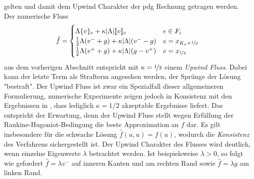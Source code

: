 gelten und damit dem Upwind Charakter der \ac{pdg} Rechnung getragen werden. Der numerische Fluss
\begin{equation}
  \begin{aligned}
    \hat{f} = \begin{cases}
    \Lambda\{ v \}_e + \kappa|\Lambda|\llbracket v \rrbracket_e & e\in F_i \\
    \frac{1}{2}\Lambda(v^- + g) + \kappa|\Lambda|(v^- - g)   & e=x_{K_x+\nicefrac{1}{2}} \\
    \frac{1}{2}\Lambda(v^+ + g) + \kappa|\Lambda|(g - v^+)   & e=x_{\nicefrac{1}{2}}
  \end{cases}
  \end{aligned}
  \label{eq:numflux}
\end{equation}
aus dem vorherigen Abschnitt entspricht mit $\kappa=\nicefrac{1}{2}$ einem \emph{Upwind Fluss}. Dabei kann der letzte Term als Strafterm angesehen werden, der Sprünge der Lösung "bestraft". Der Upwind Fluss ist zwar ein Spezialfall dieser allgemeineren Formulierung, numerische Experimente zeigen jedoch in Konsistenz mit den Ergebnissen in \cite{feistauer2004}, dass lediglich $\kappa=1/2$ akzeptable Ergebnisse liefert. Das entspricht der Erwartung, denn der Upwind Fluss stellt wegen Erfüllung der Rankine-Hugoniot-Bedingung die beste Approximation an $f$ dar. Es gilt insbesondere für die schwache Lösung $\hat{f}(u,u)=f(u)$, wodurch die \emph{Konsistenz} des Verfahrens sichergestellt ist. Der Upwind Charakter des Flusses wird deutlich, wenn einzelne Eigenwerte $\lambda$ betrachtet werden. Ist beispielsweise $\lambda>0$, so folgt wie gefordert $\hat{f}=\lambda v^-$ auf inneren Kanten und am rechten Rand sowie $\hat{f}=\lambda g$ am linken Rand.

